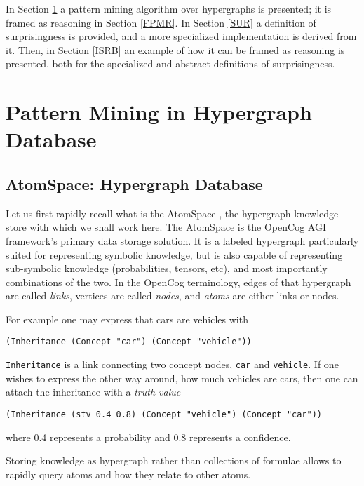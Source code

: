 \documentclass[runningheads]{llncs}
\begin{document}
In Section \ref{PMHD} a pattern mining algorithm over hypergraphs is
presented; it is framed as reasoning in Section \ref{FPMR}. In Section
\ref{SUR} a definition of surprisingness is provided, and a more
specialized implementation is derived from it. Then, in Section
\ref{ISRB} an example of how it can be framed as reasoning is
presented, both for the specialized and abstract definitions of
surprisingness.

\section{Pattern Mining in Hypergraph Database}
\label{PMHD}

\subsection{AtomSpace: Hypergraph Database}

Let us first rapidly recall what is the AtomSpace
\cite{Goertzel2014EGI2}, the hypergraph knowledge store with which we
shall work here.  The AtomSpace is the OpenCog AGI framework's primary
data storage solution. It is a labeled hypergraph particularly suited
for representing symbolic knowledge, but is also capable of
representing sub-symbolic knowledge (probabilities, tensors, etc), and
most importantly combinations of the two. In the OpenCog terminology,
edges of that hypergraph are called \emph{links}, vertices are called
\emph{nodes}, and \emph{atoms} are either links or nodes.

For example
one may express that cars are vehicles with
\begin{verbatim}
(Inheritance (Concept "car") (Concept "vehicle"))
\end{verbatim}
\texttt{Inheritance} is a link connecting two concept nodes,
\texttt{car} and \texttt{vehicle}.  If one wishes to express the other
way around, how much vehicles are cars, then one can attach the
inheritance with a \emph{truth value}
\begin{verbatim}
(Inheritance (stv 0.4 0.8) (Concept "vehicle") (Concept "car"))
\end{verbatim}
where 0.4 represents a probability and 0.8 represents a confidence.

Storing knowledge as hypergraph rather than collections of formulae
allows to rapidly query atoms and how they relate to other atoms.
\end{document}
